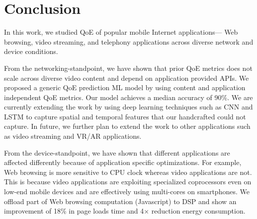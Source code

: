 \section{Conclusion}
In this work, we studied QoE of popular mobile Internet applications--- Web browsing, video streaming, and telephony applications across diverse network and device conditions.

From the networking-standpoint, we have shown that prior QoE metrics does not scale across diverse video content and depend on application provided APIs. 
We proposed a generic QoE prediction ML model by using content and application independent QoE metrics.
Our model achieves a median accuracy of 90\%.
We are currently extending the work by using deep learning techniques such as CNN and LSTM to capture spatial and temporal features that our handcrafted could not capture. 
In future, we further plan to extend the work to other applications such as video streaming and VR/AR applications.

From the device-standpoint, we have shown that different applications are affected differently because of application specific optimizations.
For example, Web browsing is more sensitive to CPU clock whereas video applications are not. 
This is because video applications are exploiting specialized coprocessors even on low-end mobile devices and are effectively using multi-cores on smartphones.
We offload part of Web browsing computation (Javascript) to DSP and show an improvement of 18\% in page loads time and 4$\times$ reduction energy consumption.



